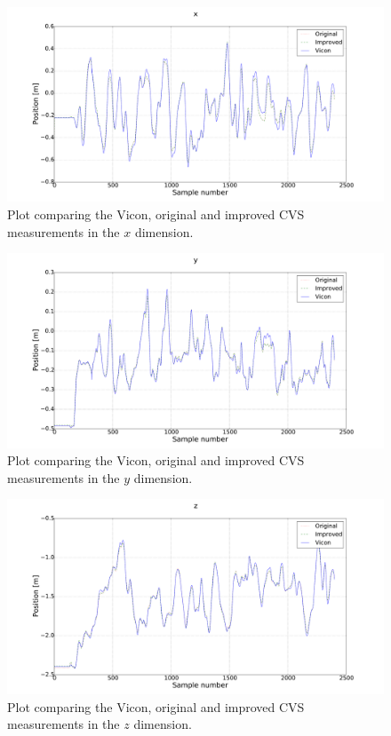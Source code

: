 \begin{figure}
  \centering
  \includegraphics[clip, trim = 100 0 140 0, width=\textwidth]{figures/chapter3/x}
  \caption{Plot comparing the Vicon, original and improved CVS measurements in the $x$ dimension.}
  \label{fig:estimate-x}
\end{figure}
\begin{figure}
  \centering
  \includegraphics[clip, trim = 100 0 140 0, width=\textwidth]{figures/chapter3/y}
  \caption{Plot comparing the Vicon, original and improved CVS measurements in the $y$ dimension.}
\end{figure}
\begin{figure}
  \centering
  \includegraphics[clip, trim = 100 0 140 0, width=\textwidth]{figures/chapter3/z}
  \caption{Plot comparing the Vicon, original and improved CVS measurements in the $z$ dimension.}
\end{figure}
